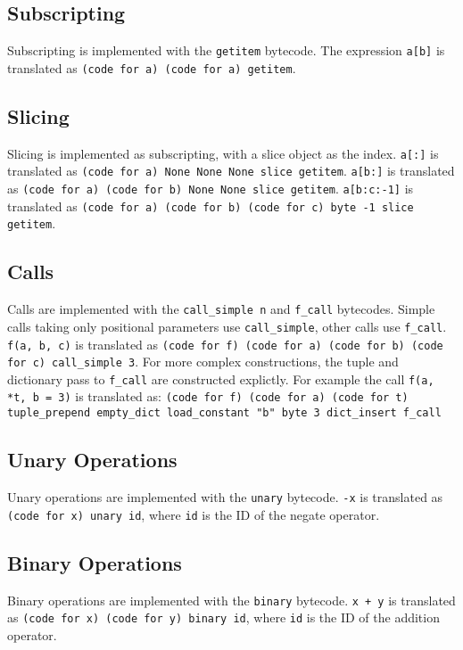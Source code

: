 \documentclass[a4paper,10pt]{article}
\begin{document}
\subsection{Subscripting}
Subscripting is implemented with the  \verb|getitem| bytecode.
The expression \verb|a[b]| is translated as \verb|(code for a) (code for a) getitem|.

\subsection{Slicing}

Slicing is implemented as subscripting, with a slice object as the index.
\verb|a[:]| is translated as \verb|(code for a) None None None slice getitem|.
\verb|a[b:]| is translated as \verb|(code for a) (code for b) None None slice getitem|.
\verb|a[b:c:-1]| is translated as \verb|(code for a) (code for b) (code for c) byte -1 slice getitem|.

\subsection{Calls}

Calls are implemented with the \verb|call_simple n| and \verb|f_call| bytecodes.
Simple calls taking only positional parameters use \verb|call_simple|, other calls use \verb|f_call|.
\verb|f(a, b, c)| is translated as \verb|(code for f) (code for a) (code for b) (code for c) call_simple 3|.
For more complex constructions, the tuple and dictionary pass to \verb|f_call| are constructed explictly.
For example the call \verb|f(a, *t, b = 3)| is translated as:
\verb|(code for f) (code for a) (code for t) tuple_prepend empty_dict load_constant "b" byte 3 dict_insert f_call|

\subsection{Unary Operations}
Unary operations are implemented with the \verb|unary| bytecode. \verb|-x| is translated as \verb|(code for x) unary id|,
where \verb|id| is the ID of the negate operator. 

\subsection{Binary Operations}
Binary operations are implemented with the \verb|binary| bytecode. \verb|x + y| is translated as \verb|(code for x) (code for y) binary id|,
where \verb|id| is the ID of the addition operator. 
\end{document}
